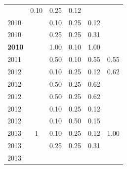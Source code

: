 \begin{table}[H]
\begin{tabular}{| l | c | c | c | c | c |}
          &
          0.10
          &
          0.25
          &
          0.12
          &
          \\
            2010
          &
          
          &
          0.10
          &
          0.25
          &
          0.12
          &
          \\
            2010
          &
          
          &
          0.25
          &
          0.25
          &
          0.31
          &
          \\
            {\bf 2010}
          &
          
          &
          1.00
          &
          0.10
          &
          1.00
          &
          \\
\hline
            2011
          &
          
          &
          0.50
          &
          0.10
          &
          0.55
          &
            {\color{blue} 0.55}
          \\
\hline
            2012
          &
          
          &
          0.10
          &
          0.25
          &
          0.12
          &
            {\color{blue} 0.62}
          \\
            2012
          &
          
          &
          0.50
          &
          0.25
          &
          0.62
          &
          \\
            2012
          &
          
          &
          0.50
          &
          0.25
          &
          0.62
          &
          \\
            2012
          &
          
          &
          0.10
          &
          0.25
          &
          0.12
          &
          \\
            2012
          &
          
          &
          0.10
          &
          0.50
          &
          0.15
          &
          \\
\hline
            2013
          &
          1
          &
          0.10
          &
          0.25
          &
          0.12
          &
            {\color{blue} 1.00}
          \\
            2013
          &
          
          &
          0.25
          &
          0.25
          &
          0.31
          &
          \\
            2013
          &
          

\end{tabular}
\end{table}
